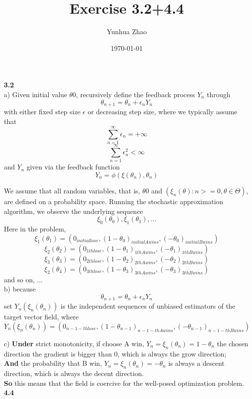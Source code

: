 \documentclass{article}
\title{Exercise 3.2+4.4}
\author{Yunhua Zhao}
\date{\today}
\begin{document}
\maketitle

\textbf {3.2}  \\
a) Given initial value $\theta0$, recursively define the feedback process ${Y_n}$ through $$ \theta_{n+1} = \theta_n+\epsilon_nY_n $$
with either fixed step size $\epsilon$ or decreasing step size, where we typically assume that 
$$ \sum_{n=1}^{\infty}\epsilon_n = +\infty $$
$$ \sum_{n=1}^{\infty}\epsilon_n^2 < \infty $$
and $Y_n$ given via the feedback function
$$ Y_n = \phi(\xi(\theta_n),\theta_n) $$
 
We assume that all random variables, that is, $\theta0$ and $ ({\xi_n(\theta):n>=0, \theta\in\Theta}) $, are defined on a probability
space. Running the stochastic approximation algorithm, we observe the underlying
sequence
$$ \xi_0(\theta_0), \xi_1(\theta_1),... $$ 
Here in the problem, 
$$ \xi_1(\theta_1) = (0_{initial lose},(1-\theta_{0})_{initial A wins}, (-\theta_{0})_{initial B wins}) $$
$$ \xi_2(\theta_2) = (0_{1th lose},(1-\theta_{1})_{1th A wins}, (-\theta_{1})_{1th B wins}) $$
$$ \xi_3(\theta_3) = (0_{2th lose},(1-\theta_{2})_{2th A wins}, (-\theta_{2})_{2th B wins}) $$
$$ \xi_2(\theta_4) = (0_{3th lose},(1-\theta_{3})_{3th A wins}, (-\theta_{3})_{3th B wins}) $$
and so on, ...  \\

b) because $$ \theta_{n+1} = \theta_n+\epsilon_nY_n $$ 
set $Y_n(\xi_n(\theta_n))$ is the independent sequences of unbiased estimators of the target vector field, where
$$Y_n(\xi_n(\theta_n)) = (0_{n-1-th lose}, (1-\theta_{n-1})_{n-1-th A wins}, (-\theta_{n-1})_{n-1-th B wins}) $$


c) \textbf{Under} strict monotonicity, if choose A win, $Y_n=\xi_n(\theta_n) = 1-\theta_n$ the chosen direction the gradient is bigger than 0, which is always the grow direction;  \\
\textbf{And} the probability that B win,  $Y_n=\xi_n(\theta_n) = -\theta_n$ is always a descent direction, which is always the decent direction. \\
\textbf{So} this means that the field is coercive for the well-posed optimization problem.  \\

\textbf {4.4}  \\
\end{document}
